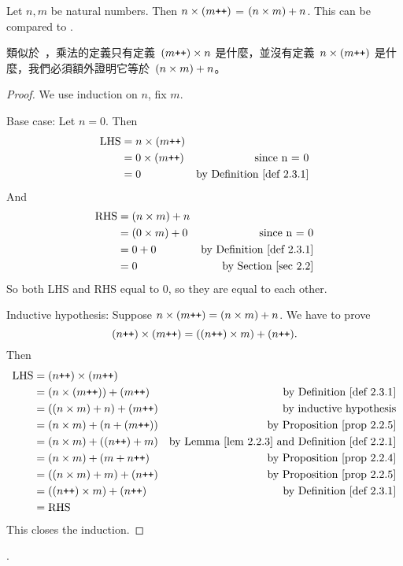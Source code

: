 \begin{additional corollary} \label{ac 2.3.3}
Let \(n, m\) be natural numbers. Then \(n \times (m\texttt{++})\) = \((n \times m) + n\). This can be compared to .
\end{additional corollary}
\begin{note}
類似於\ ，乘法的定義只有定義\ \((m\texttt{++}) \times n\) 是什麼，並沒有定義\ \(n \times (m\texttt{++})\) 是什麼，我們必須額外證明它等於\ \((n \times m) + n\)。
\end{note}
\begin{proof}
We use induction on \(n\), fix \(m\).

Base case: Let \(n = 0\). Then
\begin{align*}
    \text{LHS} & = n \X (m\INC) \\
               & = 0 \X (m\INC) & \text{since n = 0} \\
               & = 0 & \text{by \DEF{2.3.1}}
\end{align*}
And
\begin{align*}
    \text{RHS} & = (n \X m) + n \\
               & = (0 \X m) + 0 & \text{since n = 0} \\
               & = 0 + 0 & \text{by \DEF{2.3.1}} \\
               & = 0 & \text{by Section \ref{sec 2.2}}
\end{align*}
So both LHS and RHS equal to \(0\), so they are equal to each other.

Inductive hypothesis: Suppose \(n \times (m\texttt{++}) = (n \times m) + n\). We have to prove
\[(n\texttt{++}) \times (m\texttt{++}) = ((n\texttt{++}) \times m) + (n\texttt{++}).\]
Then
\begin{align*}
    \text{LHS} & = (n\INC) \X (m\INC) \\
               & = (n \X (m\INC)) + (m\INC) & \text{by \DEF{2.3.1}} \\
               & = ((n \X m) + n) + (m\INC) & \text{by inductive hypothesis} \\
               & = (n \X m) + (n + (m\INC)) & \text{by \PROP{2.2.5}} \\
               & = (n \X m) + ((n\INC) + m) & \text{by \LEM{2.2.3} and \DEF{2.2.1}} \\
               & = (n \X m) + (m + n\INC) & \text{by \PROP{2.2.4}} \\
               & = ((n \X m) + m) + (n\INC) & \text{by \PROP{2.2.5}} \\
               & = ((n\INC) \X m) + (n\INC) & \text{by \DEF{2.3.1}} \\
               & = \text{RHS}
\end{align*}
This closes the induction.
\end{proof}.

